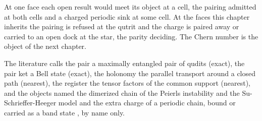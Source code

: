 At one face each open result would meet its object at a cell, the pairing admitted at both cells and a charged periodic sink at some cell. At the faces this chapter inherits the pairing is refused at the qutrit and the charge is paired away or carried to an open dock at the star, the parity deciding. The Chern number is the object of the next chapter.
\begin{chbridge}
The literature calls the pair a maximally entangled pair of qudits (exact), the pair ket a Bell state (exact), the holonomy the parallel transport around a closed path (nearest), the register the tensor factors of the common support (nearest), and the objects named the dimerized chain of the Peierls instability and the Su-Schrieffer-Heeger model \cite{Peierls1955,SuSchriefferHeeger1979} and the extra charge of a periodic chain, bound or carried as a band state \cite{AshcroftMermin1976}, by name only.
\end{chbridge}
